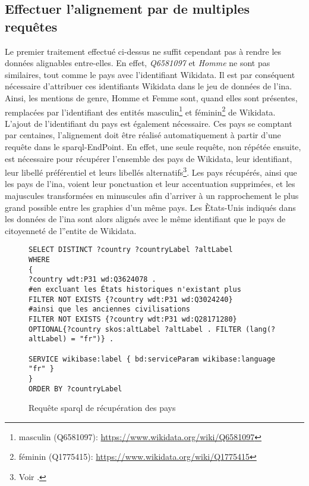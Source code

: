 \subsection{\label{II-C-2-c}Effectuer l'alignement par de multiples requêtes}

Le premier traitement effectué ci-dessus ne suffit cependant pas à rendre les données alignables entre-elles. En effet, \textit{Q6581097} et \textit{Homme} ne sont pas similaires, tout comme le pays avec l'identifiant Wikidata. Il est par conséquent nécessaire d'attribuer ces identifiants Wikidata dans le jeu de données de l'\ac{ina}. Ainsi, les mentions de genre, \og Homme\fg{} et \og Femme\fg{} sont, quand elles sont présentes, remplacées par l'identifiant des entités \og masculin\fg{}\footnote{masculin (Q6581097): \url{https://www.wikidata.org/wiki/Q6581097}} et \og féminin\fg{}\footnote{féminin (Q1775415): \url{https://www.wikidata.org/wiki/Q1775415}} de Wikidata.\\

L'ajout de l'identifiant du pays est également nécessaire. Ces pays se comptant par centaines, l'alignement doit être réalisé automatiquement à partir d'une requête dans le \ac{sparql}-EndPoint. En effet, une seule requête, non répétée ensuite, est nécessaire pour récupérer l'ensemble des pays de Wikidata, leur identifiant, leur libellé préférentiel et leurs libellés alternatifs\footnote{Voir .}. Les pays récupérés, ainsi que les pays de l'\ac{ina}, voient leur ponctuation et leur accentuation supprimées, et les majuscules transformées en minuscules afin d'arriver à un rapprochement le plus grand possible entre les graphies d'un même pays. Les Ètats-Unis indiqués dans les données de l'\ac{ina} sont alors alignés avec le même identifiant que le pays de citoyenneté de l''entite  de Wikidata.

\begin{figure}[!h]
	\centering
\begin{verbatim}
SELECT DISTINCT ?country ?countryLabel ?altLabel
WHERE
{
?country wdt:P31 wd:Q3624078 .
#en excluant les États historiques n'existant plus
FILTER NOT EXISTS {?country wdt:P31 wd:Q3024240}
#ainsi que les anciennes civilisations
FILTER NOT EXISTS {?country wdt:P31 wd:Q28171280}
OPTIONAL{?country skos:altLabel ?altLabel . FILTER (lang(?altLabel) = "fr")} .
		
SERVICE wikibase:label { bd:serviceParam wikibase:language "fr" }
}
ORDER BY ?countryLabel
\end{verbatim}
\caption{Requête \ac{sparql} de récupération des pays}
\label{sparql_pays}
\end{figure}

